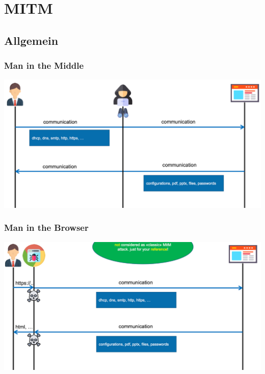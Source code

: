 


\section{MITM}\label{sec:mitm}

\subsection{Allgemein}\label{subsec:allgemein}

\subsubsection{Man in the Middle}\label{subsubsec:man-in-the-middle}
\begin{center}
    \includegraphics[width=1.0\linewidth]{./img/09-mitm/mitm_overview}
    \vspace{-8pt}
\end{center}
\vspace{-8pt}

\subsubsection{Man in the Browser}\label{subsubsec:man-in-the-browser}
\begin{center}
    \includegraphics[width=1.0\linewidth]{./img/09-mitm/mitb_overview}
    \vspace{-8pt}
\end{center}
\vspace{-8pt}

